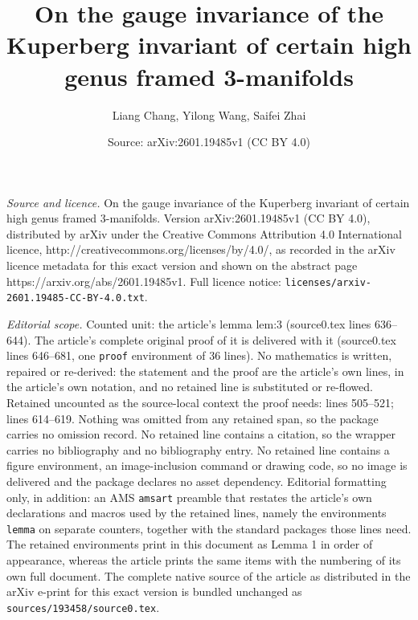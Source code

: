 \documentclass[10pt,a4paper]{amsart}
\title{On the gauge invariance of the Kuperberg invariant of certain high genus framed 3-manifolds}
\author{Liang Chang, Yilong Wang, Saifei Zhai}
\date{Source: arXiv:2601.19485v1 (CC BY 4.0)}
\begin{document}
\maketitle

\noindent\emph{Source and licence.} On the gauge invariance of the Kuperberg invariant of certain high genus framed 3-manifolds. Version arXiv:2601.19485v1 (CC BY 4.0), distributed by arXiv under the Creative Commons Attribution 4.0 International licence, http://creativecommons.org/licenses/by/4.0/, as recorded in the arXiv licence metadata for this exact version and shown on the abstract page https://arxiv.org/abs/2601.19485v1. Full licence notice: \texttt{licenses/arxiv-2601.19485-CC-BY-4.0.txt}.\par\smallskip

\noindent\textit{Editorial scope.} Counted unit: the article's lemma lem:3 (source0.tex lines 636--644). The article's complete original proof of it is delivered with it (source0.tex lines 646--681, one \texttt{proof} environment of 36 lines). No mathematics is written, repaired or re-derived: the statement and the proof are the article's own lines, in the article's own notation, and no retained line is substituted or re-flowed.  Retained uncounted as the source-local context the proof needs: lines 505--521; lines 614--619.  Nothing was omitted from any retained span, so the package carries no omission record.  No retained line contains a citation, so the wrapper carries no bibliography and no bibliography entry.  No retained line contains a figure environment, an image-inclusion command or drawing code, so no image is delivered and the package declares no asset dependency.  Editorial formatting only, in addition: an AMS \texttt{amsart} preamble that restates the article's own declarations and macros used by the retained lines, namely the environments \texttt{lemma} on separate counters, together with the standard packages those lines need.  The retained environments print in this document as Lemma 1 in order of appearance, whereas the article prints the same items with the numbering of its own full document.  The complete native source of the article as distributed in the arXiv e-print for this exact version is bundled unchanged as \texttt{sources/193458/source0.tex}.
\end{document}
